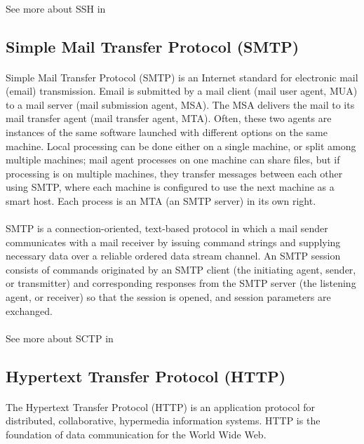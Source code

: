 \paragraph{}See more about SSH in \cite{SSH}

\subsection{Simple Mail Transfer Protocol (SMTP)} 
\paragraph{}Simple Mail Transfer Protocol (SMTP) is an Internet standard for electronic mail (email) transmission. Email is submitted by a mail client (mail user agent, MUA) to a mail server (mail submission agent, MSA). The MSA delivers the mail to its mail transfer agent (mail transfer agent, MTA). Often, these two agents are instances of the same software launched with different options on the same machine. Local processing can be done either on a single machine, or split among multiple machines; mail agent processes on one machine can share files, but if processing is on multiple machines, they transfer messages between each other using SMTP, where each machine is configured to use the next machine as a smart host. Each process is an MTA (an SMTP server) in its own right.
\paragraph{}SMTP is a connection-oriented, text-based protocol in which a mail sender communicates with a mail receiver by issuing command strings and supplying necessary data over a reliable ordered data stream channel. An SMTP session consists of commands originated by an SMTP client (the initiating agent, sender, or transmitter) and corresponding responses from the SMTP server (the listening agent, or receiver) so that the session is opened, and session parameters are exchanged.
\paragraph{}See more about SCTP in \cite{SMTP}

\subsection{Hypertext Transfer Protocol (HTTP)} 
\paragraph{}The Hypertext Transfer Protocol (HTTP) is an application protocol for distributed, collaborative, hypermedia information systems. HTTP is the foundation of data communication for the World Wide Web.
